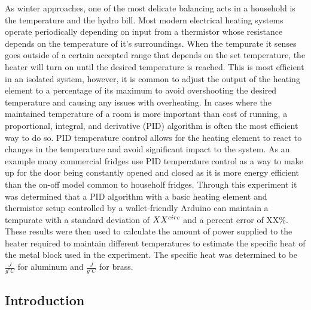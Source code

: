 \documentclass[11pt]{article}
\begin{document}
    As winter approaches, one of the most delicate balancing acts in a
household is the temperature and the hydro bill. Most modern electrical
heating systems operate periodically depending on input from a
thermistor whose resistance depends on the temperature of it's
surroundings. When the tempurate it senses goes outside of a certain
accepted range that depends on the set temperature, the heater will turn
on until the desired temperature is reached. This is most efficient in
an isolated system, however, it is common to adjust the output of the
heating element to a percentage of its maximum to avoid overshooting the
desired temperature and causing any issues with overheating. In cases
where the maintained temperature of a room is more important than cost
of running, a proportional, integral, and derivative (PID) algorithm is
often the most efficient way to do so. PID temperature control allows
for the heating element to react to changes in the temperature and avoid
significant impact to the system. As an example many commercial fridges
use PID temperature control as a way to make up for the door being
constantly opened and closed as it is more energy efficient than the
on-off model common to householf fridges. Through this experiment it was
determined that a PID algorithm with a basic heating element and
thermistor setup controlled by a wallet-friendly Arduino can maintain a
tempurate with a standard deviation of \(XX^{\\circ }\) and a percent
error of XX\%. These results were then used to calculate the amount of
power supplied to the heater required to maintain different temperatures
to estimate the specific heat of the metal block used in the experiment.
The specific heat was determined to be \(\frac{J}{g^{\circ}C}\) for
aluminum and \(\frac{J}{g^{\circ}C}\) for brass.

    \hypertarget{introduction}{%
\subsection{Introduction}\label{introduction}}
\end{document}
